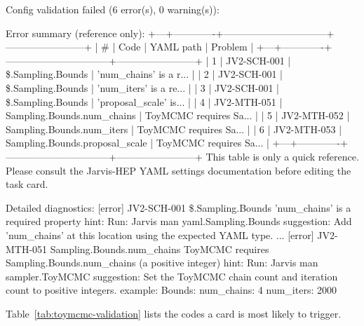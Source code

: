 \begin{terminal}
\begin{jout}
Config validation failed (6 error(s), 0 warning(s)):

Error summary (reference only):
+---+-------------+--------------------------------+------------------------+
| # | Code        | YAML path                      | Problem                |
+---+-------------+--------------------------------+------------------------+
| 1 | JV2-SCH-001 | \$.Sampling.Bounds              | 'num_chains' is a r... |
| 2 | JV2-SCH-001 | \$.Sampling.Bounds              | 'num_iters' is a re... |
| 3 | JV2-SCH-001 | \$.Sampling.Bounds              | 'proposal_scale' is... |
| 4 | JV2-MTH-051 | Sampling.Bounds.num_chains     | ToyMCMC requires Sa... |
| 5 | JV2-MTH-052 | Sampling.Bounds.num_iters      | ToyMCMC requires Sa... |
| 6 | JV2-MTH-053 | Sampling.Bounds.proposal_scale | ToyMCMC requires Sa... |
+---+-------------+--------------------------------+------------------------+
This table is only a quick reference. Please consult the Jarvis-HEP YAML settings
documentation before editing the task card.

Detailed diagnostics:
  [error] JV2-SCH-001  \$.Sampling.Bounds
          'num_chains' is a required property
          hint: Run: Jarvis man yaml.Sampling.Bounds
          suggestion: Add 'num_chains' at this location using the expected
          YAML type.
  ...
  [error] JV2-MTH-051  Sampling.Bounds.num_chains
          ToyMCMC requires Sampling.Bounds.num_chains (a positive integer)
          hint: Run: Jarvis man sampler.ToyMCMC
          suggestion: Set the ToyMCMC chain count and iteration count to
          positive integers.
          example:
            Bounds:
              num_chains: 4
              num_iters: 2000
\end{jout}
\end{terminal}

Table~\ref{tab:toymcmc-validation} lists the codes a  card is most
likely to trigger.

